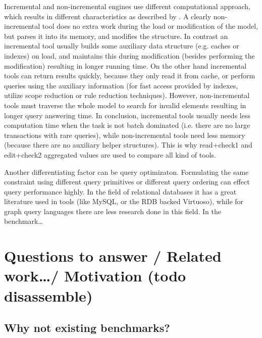Incremental and non-incremental engines use different computational approach,
which results in different characteristics as described by
. A clearly non-incremental tool does no extra work
during the load or modification of the model, but parses it into its memory, and
modifies the structure. In contrast an incremental tool usually builds some
auxiliary data structure (e.g. caches or indexes) on load, and maintains this
during modification (besides performing the modification) resulting in longer
running time. On the other hand incremental tools can return results quickly,
because they only read it from cache, or perform queries using the auxiliary
information (for fast access provided by indexes, utilize scope reduction or
rule reduction techniques). However, non-incremental tools must traverse the
whole model to search for invalid elements resulting in longer query answering
time. In conclusion, incremental tools usually needs less computation time when
the task is not batch dominated (i.e. there are no large transactions with rare
queries), while non-incremental tools need less memory (because there are no
auxiliary helper structures). This is why read+check1 and edit+check2 aggregated
values are used to compare all kind of tools.

Another differentiating factor can be query optimizaton. Formulating the same
constraint using different query primitives or different query ordering can
effect query performance highly. In the field of relational databases it has a
great literature used in tools (like MySQL, or the RDB backed Virtuoso), while
for graph query languages there are less research done in this field. 
 In the benchmark\ldots {}

\section{Questions to answer / Related work\ldots / Motivation (todo disassemble)}

\subsection{Why not existing benchmarks?}

